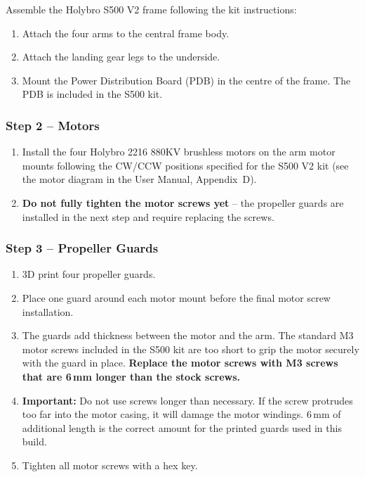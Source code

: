 \documentclass{article}
\begin{document}
Assemble the Holybro S500 V2 frame following the kit instructions:
\begin{enumerate}
    \item Attach the four arms to the central frame body.
    \item Attach the landing gear legs to the underside.
    \item Mount the Power Distribution Board (PDB) in the centre of the frame. The PDB is included in the S500 kit.
\end{enumerate}

\subsubsection{Step 2 -- Motors}

\begin{enumerate}
    \item Install the four Holybro 2216 880KV brushless motors on the arm motor mounts following the CW/CCW positions specified for the S500 V2 kit (see the motor diagram in the User Manual, Appendix~D).
    \item \textbf{Do not fully tighten the motor screws yet} -- the propeller guards are installed in the next step and require replacing the screws.
\end{enumerate}

\subsubsection{Step 3 -- Propeller Guards}
\label{sec:propguard}

\begin{enumerate}
    \item 3D print four propeller guards.
    \item Place one guard around each motor mount before the final motor screw installation.
    \item The guards add thickness between the motor and the arm. The standard M3 motor screws included in the S500 kit are too short to grip the motor securely with the guard in place. \textbf{Replace the motor screws with M3 screws that are 6\,mm longer than the stock screws.}
    \item \textbf{Important:} Do not use screws longer than necessary. If the screw protrudes too far into the motor casing, it will damage the motor windings. 6\,mm of additional length is the correct amount for the printed guards used in this build.
    \item Tighten all motor screws with a hex key.
\end{enumerate}
\end{document}
